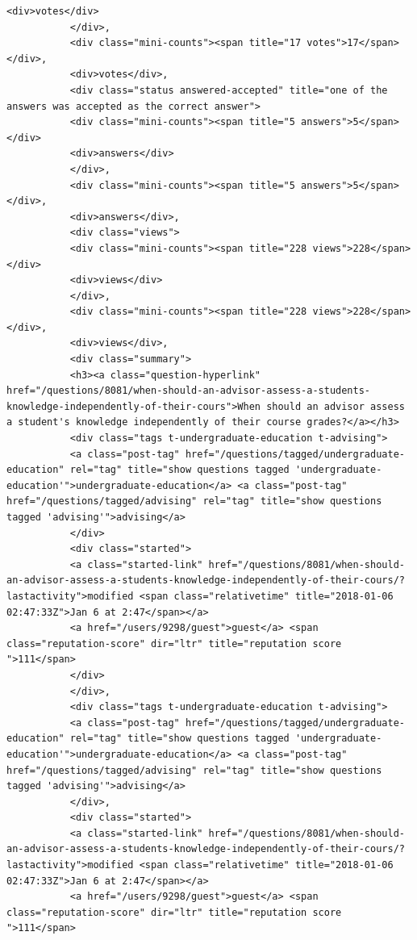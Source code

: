 \documentclass[11pt]{article}
\begin{document}
\begin{Verbatim}[commandchars=\\\{\}]
           <div>votes</div>
           </div>,
           <div class="mini-counts"><span title="17 votes">17</span></div>,
           <div>votes</div>,
           <div class="status answered-accepted" title="one of the answers was accepted as the correct answer">
           <div class="mini-counts"><span title="5 answers">5</span></div>
           <div>answers</div>
           </div>,
           <div class="mini-counts"><span title="5 answers">5</span></div>,
           <div>answers</div>,
           <div class="views">
           <div class="mini-counts"><span title="228 views">228</span></div>
           <div>views</div>
           </div>,
           <div class="mini-counts"><span title="228 views">228</span></div>,
           <div>views</div>,
           <div class="summary">
           <h3><a class="question-hyperlink" href="/questions/8081/when-should-an-advisor-assess-a-students-knowledge-independently-of-their-cours">When should an advisor assess a student's knowledge independently of their course grades?</a></h3>
           <div class="tags t-undergraduate-education t-advising">
           <a class="post-tag" href="/questions/tagged/undergraduate-education" rel="tag" title="show questions tagged 'undergraduate-education'">undergraduate-education</a> <a class="post-tag" href="/questions/tagged/advising" rel="tag" title="show questions tagged 'advising'">advising</a>
           </div>
           <div class="started">
           <a class="started-link" href="/questions/8081/when-should-an-advisor-assess-a-students-knowledge-independently-of-their-cours/?lastactivity">modified <span class="relativetime" title="2018-01-06 02:47:33Z">Jan 6 at 2:47</span></a>
           <a href="/users/9298/guest">guest</a> <span class="reputation-score" dir="ltr" title="reputation score ">111</span>
           </div>
           </div>,
           <div class="tags t-undergraduate-education t-advising">
           <a class="post-tag" href="/questions/tagged/undergraduate-education" rel="tag" title="show questions tagged 'undergraduate-education'">undergraduate-education</a> <a class="post-tag" href="/questions/tagged/advising" rel="tag" title="show questions tagged 'advising'">advising</a>
           </div>,
           <div class="started">
           <a class="started-link" href="/questions/8081/when-should-an-advisor-assess-a-students-knowledge-independently-of-their-cours/?lastactivity">modified <span class="relativetime" title="2018-01-06 02:47:33Z">Jan 6 at 2:47</span></a>
           <a href="/users/9298/guest">guest</a> <span class="reputation-score" dir="ltr" title="reputation score ">111</span>

\end{Verbatim}
\end{document}
